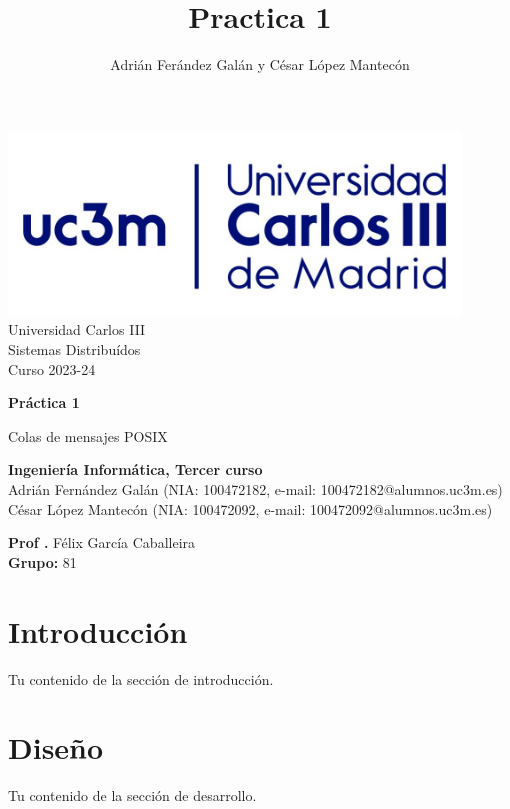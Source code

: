\documentclass[]{article}
\title{Practica 1}
\author{Adrián Ferández Galán y César López Mantecón}
\begin{document}
\begin{titlepage}
    \centering
   \includegraphics[width=0.9\textwidth]{uc3m.jpg} 
    {\Huge Universidad Carlos III\\
    
     \Large Sistemas Distribuídos\\
     \vspace{0.5cm}
     Curso 2023-24}
    \vspace{2cm}

    {\Huge \textbf{Práctica 1} \par}
    \vspace{0.5cm}
    {\Large Colas de mensajes POSIX \par}
    \vspace{8cm}

   \textbf{Ingeniería Informática, Tercer curso}\\
    \vspace{0.2cm} 
    Adrián Fernández Galán (NIA: 100472182, e-mail: 100472182@alumnos.uc3m.es) \\
    César López Mantecón   (NIA: 100472092, e-mail: 100472092@alumnos.uc3m.es)
    \vspace{0.5cm}

   
    \textbf{Prof .} Félix García Caballeira\\
    \textbf{Grupo: } 81   
    
\end{titlepage}
\newpage

\renewcommand{\contentsname}{\centering Índice}
\tableofcontents

\newpage
\section{Introducción}
\label{sec:introduccion}
Tu contenido de la sección de introducción.

\section{Diseño}
\label{sec:disenno}
Tu contenido de la sección de desarrollo.
\end{document}
